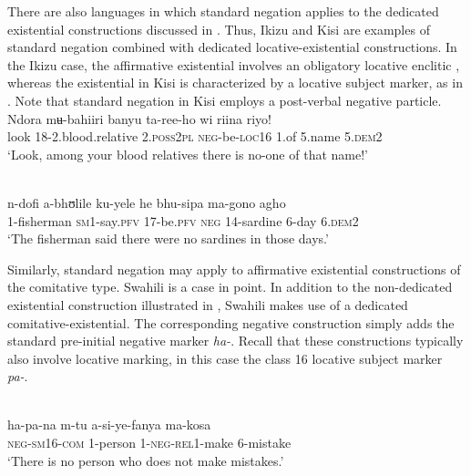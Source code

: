 \documentclass[output=paper,draft,draftmode,colorlinks,citecolor=brown]{langscibook}
\begin{document}
There are also
languages in which standard negation applies to the dedicated existential
constructions discussed in . Thus, Ikizu and
Kisi are examples of standard negation combined with dedicated
locative-existential constructions. In the Ikizu case, the affirmative
existential involves an obligatory locative enclitic
, whereas the existential in Kisi is characterized
by a locative subject marker, as in . Note that standard negation in Kisi employs a post-verbal negative
particle.  \ea\label{ex:ikizu-relatives} \\
\gll Ndora mʉ-bahiiri banyu ta-ree-ho wi riina riyo!\\
look 18-2.blood.relative 2.\textsc{poss2pl} \textsc{neg}-be-\textsc{loc}16 1.of 5.name 5.\textsc{dem}2\\
\glt`Look,
among your blood relatives there is no-one of that name!'
\z


\ea\label{ex:kisi-sardines} \\
\gll n-dofi a-bhʊlile ku-yele he bhu-sipa ma-gono agho\\
1-fisherman \textsc{sm1}-say.\textsc{pfv} 17-be.\textsc{pfv}
\textsc{neg} 14-sardine 6-day 6.\textsc{dem}2\\
\glt `The fisherman said there were no sardines in those days.'
\z


%
Similarly, standard negation may apply to affirmative existential
constructions of the comitative type.  Swahili is a case in
point. In addition to the non-dedicated existential construction
illustrated in , Swahili makes use of a dedicated
co\-mi\-ta\-ti\-ve-exis\-ten\-tial. The corresponding negative 
construction simply adds the standard pre-initial negative marker \textit{ha-}. Recall that these constructions typically also involve locative marking, in this case the class 16 locative subject marker \textit{pa-}.  %

\ea\label{ex:swahili-mistake} \\
\gll ha-pa-na m-tu a-si-ye-fanya ma-kosa\\
\textsc{neg}-\textsc{sm}16-\textsc{com} 1-person
1-\textsc{neg}-\textsc{rel}1-make 6-mistake\\
\glt `There is no person who
does not make mistakes.'
\z
\end{document}
